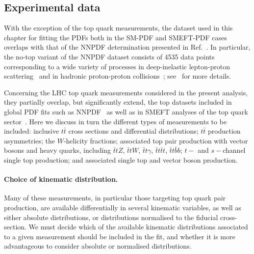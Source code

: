 \documentclass[withindex,glossary]{cam-thesis}
\begin{document}
\subsection{Experimental data}
\label{sec:baseline_data}

With the exception of the top quark measurements, the dataset used in
this chapter for fitting the PDFs both in the SM-PDF and SMEFT-PDF cases
overlaps with that of the NNPDF determination presented in Ref.~\cite{NNPDF:2021njg}.
%
In particular,
the no-top variant of the NNPDF dataset consists of 4535 data points
corresponding to a wide variety of processes in
deep-inelastic lepton-proton scattering~\cite{Arneodo:1996kd,Arneodo:1996qe,Whitlow:1991uw,Benvenuti:1989rh,Onengut:2005kv,Goncharov:2001qe,MasonPhD,Abramowicz:2015mha,H1:2018flt}
and in hadronic proton-proton collisions~\cite{Moreno:1990sf,Webb:2003ps,Towell:2001nh,Aaltonen:2010zza,Abazov:2007jy,Abazov:2013rja,D0:2014kma,Abulencia:2007ez,Aad:2011dm,Aaboud:2016btc,Aad:2014qja,Aad:2013iua,Chatrchyan:2012xt,Chatrchyan:2013mza,Chatrchyan:2013tia,Khachatryan:2016pev, Aaij:2012mda,Aaij:2015gna,Aaij:2015vua,Aaij:2015zlq,Aad:2016zzw,Aaboud:2017ffb,Aad:2019rou,Aaij:2016qqz,Aad:2016naf,Aaij:2016mgv,Aad:2015auj,Khachatryan:2015oaa, Aaboud:2017soa, Sirunyan:2017wgx,Aad:2011fc,Aad:2013lpa,Aad:2014vwa,Chatrchyan:2012bja,Khachatryan:2015luy,Aaboud:2017dvo,Khachatryan:2016mlc,Aad:2016xcr,ATLAS:2017nah}; see~\cite{NNPDF:2021njg}
for more details.

Concerning the LHC top quark measurements considered in the present
analysis,
they partially overlap, but significantly extend, the top datasets included in
global PDF fits such as NNPDF~\cite{NNPDF:2021njg} as well as in SMEFT analyses of the top quark sector~\cite{Ellis:2020unq,Ethier:2021bye}.
%
Here we discuss in turn the different types of measurements to be included: inclusive $t\bar{t}$ cross sections and differential distributions; $t\bar{t}$ production asymmetries; the $W$-helicity fractions;
 associated top pair production with vector bosons and heavy quarks, including $\bar{t}t Z$, $\bar{t}t W$, $\bar{t}t \gamma$, $\bar{t}t\bar{t}t$, $\bar{t}t\bar{b}b$;
 $t-$ and $s-$channel single top production;
 and associated single top and vector boson production.

 \paragraph{Choice of kinematic distribution.}
 Many of these measurements, in particular those targeting
 top quark pair production, are available
  differentially in several kinematic variables,
 as well as either absolute distributions, or distributions normalised
 to the fiducial cross-section.
We must decide which of the
 available kinematic distributions associated to
 a given measurement should be included in the fit,
 and whether it is more advantageous to consider
 absolute or normalised distributions.
 
\end{document}
